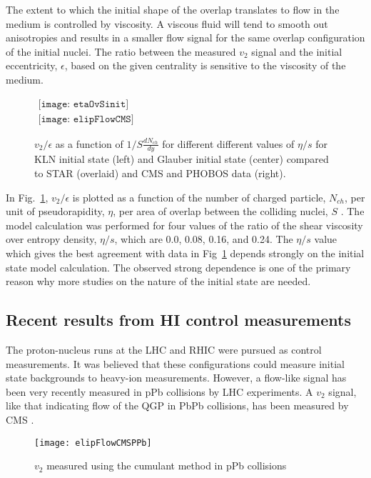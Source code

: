       The extent to which the initial shape of the overlap translates to flow
        in the medium is controlled by viscosity. 
      A viscous fluid will tend to smooth out anisotropies and results in 
        a smaller flow signal for the same overlap configuration of the initial
        nuclei. 
      The ratio between the measured $v_{2}$ signal and the initial 
        eccentricity, $\epsilon$, based on the given centrality is sensitive
        to the viscosity of the medium. 

      \begin{figure}[!Hhbt]
        \centering
        $ \begin{array}{cc}
          \texttt{[image: etaOvSinit]} \\
          \texttt{[image: elipFlowCMS]}
        \end{array} $
        \caption{$v_{2}/\epsilon$  as a function of $1/S \frac{dN_{ch}}{dy}$
          for different different values of $\eta/s$ for KLN initial state 
          (left) and Glauber initial state (center) compared to STAR (overlaid)
          and CMS and PHOBOS data (right).}
        \label{fig:elipFlow}
      \end{figure}

      In Fig.~\ref{fig:elipFlow}, $v_{2}/\epsilon$ is plotted as a function of 
        the number of charged particle, $N_{ch}$, per unit of pseudorapidity, 
        $\eta$, per area of overlap between the colliding nuclei, 
        $S$ \cite{etaOvSinit}. 
      The model calculation was performed for four values of the ratio of the 
        shear viscosity over entropy density, $\eta/s$, which are 
        0.0, 0.08, 0.16, and 0.24.
      The $\eta/s$ value which gives the best agreement with data in 
        Fig~\ref{fig:elipFlow} depends strongly on the initial state model 
        calculation.
      The observed strong dependence is one of the primary reason
        why more studies on the nature of the initial state are needed. 
      
    \subsection{Recent results from HI control measurements}
      The proton-nucleus runs at the LHC and RHIC were pursued as
        control measurements. 
      It was believed that these configurations could measure 
        initial state backgrounds to heavy-ion measurements.
      However, a flow-like signal has been very recently measured in pPb 
        collisions by LHC experiments.
      A $v_{2}$ signal, like that indicating flow of the QGP in PbPb collisions,
        has been measured by CMS \cite{}.
      \begin{figure}[!Hhbt]
        \centering
        \texttt{[image: elipFlowCMSPPb]}
        \caption{$v_{2}$ measured using the cumulant method in pPb collisions}
        \label{fig:pPbFlow}
      \end{figure}

